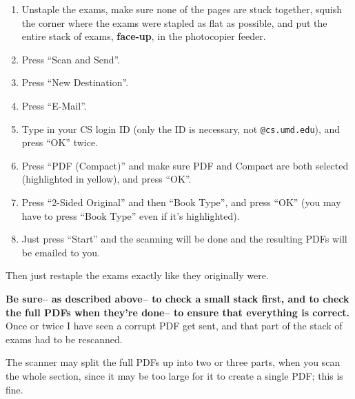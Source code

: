 \documentclass[12pt]{article}
\begin{document}
      \begin{enumerate}

        \addtolength{\itemsep}{-1mm}

        \item Unstaple the exams, make sure none of the pages are
              stuck together, squish the corner where the exams were
              stapled as flat as possible, and put the entire stack of
              exams, \textbf{face-up}, in the photocopier feeder.

        \item Press ``Scan and Send''.

        \item Press ``New Destination''.

        \item Press ``E-Mail''.

        \item Type in your CS login ID (only the ID is necessary, not
              \texttt{@cs.umd.edu}), and press ``OK'' twice.

        \item Press ``PDF (Compact)'' and make sure PDF and Compact
              are both selected (highlighted in yellow), and press
              ``OK''.

        \item Press ``2-Sided Original'' and then ``Book Type'', and
              press ``OK'' (you may have to press ``Book Type'' even
              if it's highlighted).

        \item Just press ``Start'' and the scanning will be done and
              the resulting PDFs will be emailed to you.

      \end{enumerate}

      \vspace{-2.5mm}

      Then just restaple the exams exactly like they originally were.

      \textbf{Be sure-- as described above-- to check a small stack first,
    and to check the full PDFs when they're done-- to ensure that
    everything is correct.}  Once or twice I have seen a corrupt PDF get
    sent, and that part of the stack of exams had to be rescanned.

      The scanner may split the full PDFs up into two or three parts, when
    you scan the whole section, since it may be too large for it to create
    a single PDF; this is fine.
\end{document}
